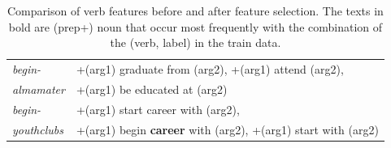 \begin{table}
\begin{scriptsize}
\begin{center}
\begin{tabular}{|l|l|}
\hline
\textit{begin-} &+(arg1) graduate from (arg2), +(arg1) attend (arg2), \\
\textit{almamater}& +(arg1) be educated at (arg2) \\
\hline
\textit{begin-} &+(arg1) start career with (arg2), \\
\textit{youthclubs}& +(arg1) begin \textbf{career} with (arg2), +(arg1) start with (arg2) \\
\hline
\end{tabular}
\caption{\label{table:verbs} Comparison of verb features before and after feature selection. The texts in bold are (prep+) noun that occur most frequently with the combination of the (verb, label) in the train data.}
\end{center}
\end{scriptsize}
\end{table}
\normalsize

